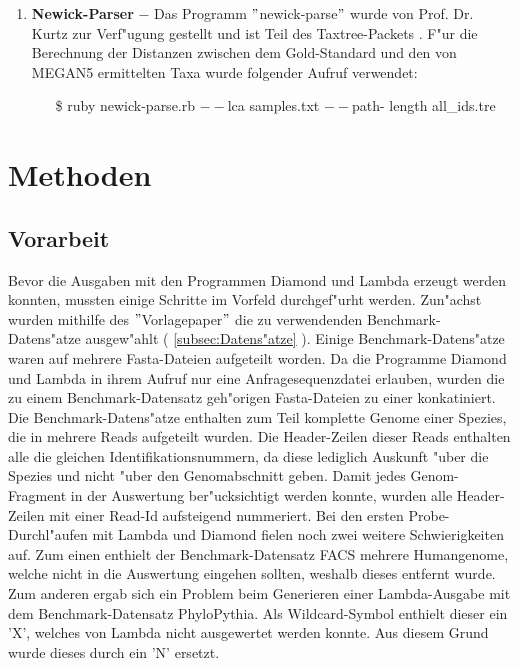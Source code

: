 \documentclass[10pt, a4paper]{report}[08.12.2015]
\begin{document}
\begin{enumerate}
          
            \item \textbf{Newick-Parser} $-$ Das Programm $"$newick-parse$"$ 
            wurde von Prof. Dr. Kurtz zur Verf"ugung gestellt und ist 
            Teil des Taxtree-Packets \cite{kurtz2016}. F"ur die Berechnung der Distanzen
            zwischen dem Gold-Standard und den von MEGAN5 ermittelten Taxa
            wurde folgender Aufruf verwendet:
			\begin{itemize}
			  \item[\$] ruby newick-parse.rb $--$lca samples.txt $--$path-					  length all\_ids.tre
		    \end{itemize}			            
            
        \end{enumerate}
        \newpage
    \section{Methoden}
    
       \subsection{Vorarbeit}
        Bevor die Ausgaben mit den Programmen Diamond und Lambda erzeugt werden konnten, mussten einige Schritte im Vorfeld durchgef"urht werden. Zun"achst wurden mithilfe des $"$Vorlagepaper$"$ \cite{bazinet2012} die zu verwendenden Benchmark-Datens"atze ausgew"ahlt ( \ref{subsec:Datens"atze} ). Einige Benchmark-Datens"atze waren auf mehrere Fasta-Dateien aufgeteilt worden. Da die Programme Diamond und Lambda in ihrem Aufruf nur eine Anfragesequenzdatei erlauben, wurden die zu einem Benchmark-Datensatz geh"origen Fasta-Dateien zu einer konkatiniert. \newline
      Die Benchmark-Datens"atze enthalten zum Teil komplette Genome einer Spezies, die in mehrere Reads aufgeteilt wurden. Die Header-Zeilen dieser Reads enthalten alle die gleichen Identifikationsnummern, da diese lediglich Auskunft "uber die Spezies und nicht "uber den Genomabschnitt geben. Damit jedes Genom-Fragment in der Auswertung ber"ucksichtigt werden konnte, wurden alle Header-Zeilen mit einer Read-Id aufsteigend nummeriert. \newline
      Bei den ersten Probe-Durchl"aufen mit Lambda und Diamond fielen noch zwei weitere Schwierigkeiten auf. Zum einen enthielt der Benchmark-Datensatz FACS mehrere Humangenome, welche nicht in die Auswertung eingehen sollten, weshalb dieses entfernt wurde. Zum anderen ergab sich ein Problem beim Generieren einer Lambda-Ausgabe mit dem Benchmark-Datensatz PhyloPythia. Als Wildcard-Symbol enthielt dieser ein 'X', welches von Lambda nicht ausgewertet werden konnte. Aus diesem Grund wurde dieses durch ein 'N' ersetzt.
\end{document}
